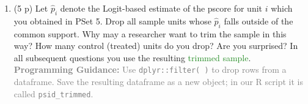 \documentclass{article}
\begin{document}
\begin{enumerate}[label=\textbf{Q\arabic{enumi}}.,ref=Q\arabic{enumi}, wide=0pt, itemsep=0em, topsep=5pt, labelindent=0pt]
\item (5 p) Let $\widehat{p}_i$ denote the Logit-based estimate of the pscore for unit $i$ which you obtained in PSet 5. Drop all sample units whose $\widehat{p}_{i}$ falls outside of the common support. Why may a researcher want to trim the sample in this way? How many control (treated) units do you drop? Are you surprised? In all subsequent questions you use the resulting \textcolor{ForestGreen}{trimmed sample}. \textcolor{gray}{\textbf{Programming Guidance:} Use \texttt{dplyr::filter( )} to drop rows from a dataframe. Save the resulting dataframe as a new object; in our R script it is called \texttt{psid\_trimmed}.}\label{item:pscore-trim}


\end{enumerate}
\end{document}
